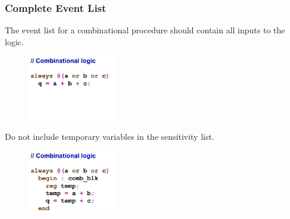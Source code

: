 \documentclass[t, notes, xcolor=table]{beamer}
\begin{document}
\begin{frame}
\frametitle{Complete Event List}
\scriptsize{
\begin{multicols}{2}
The event list for a combinational procedure should contain all inputs to the logic.
\begin{figure}
    \includegraphics[width=0.35\textwidth,left]{img/13_complete_event_1.png}
\end{figure}
\vfill
\columnbreak
Do not include temporary variables in the sensitivity list.
\begin{figure}
    \includegraphics[width=0.35\textwidth,left]{img/13_complete_event_2.png}
\end{figure}
\end{multicols}
}
\end{frame}
\end{document}
